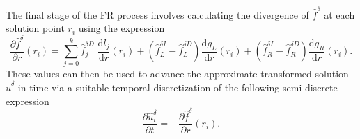 The final stage of the FR process involves calculating the divergence of $\hat{f}^{\delta}$ at each solution point $r_i$ using the expression
\begin{equation}
\frac{\partial\hat{f}^{\delta}}{\partial r}(r_i)=\sum_{j=0}^{k}\hat{f}^{\delta D}_j\;\frac{\mathrm{d}l_j}{\mathrm{d}r}(r_i)+(\hat{f}^{\delta I}_L-\hat{f}^{\delta D}_L)\frac{\mathrm{d}g_{L}}{\mathrm{d}r}(r_i)+(\hat{f}^{\delta I}_R-\hat{f}^{\delta D}_R)\frac{\mathrm{d}g_{R}}{\mathrm{d}r}(r_i).
\end{equation}
These values can then be used to advance the approximate transformed solution $\hat{u}^{\delta}$ in time via a suitable temporal discretization of the following semi-discrete expression
\begin{equation}
\frac{\partial\hat{u}^{\delta}_i}{\partial t}=-\frac{\partial\hat{f}^{\delta}}{\partial r}(r_i).
\label{semi_disc}
\end{equation}
